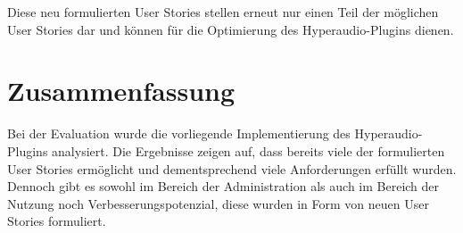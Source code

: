 Diese neu formulierten User Stories stellen erneut nur einen Teil der möglichen User Stories dar und können für die Optimierung des Hyperaudio-Plugins dienen.

\section{Zusammenfassung}
Bei der Evaluation wurde die vorliegende Implementierung des Hyperaudio-Plugins analysiert. Die Ergebnisse zeigen auf, dass bereits viele der formulierten User Stories ermöglicht und dementsprechend viele Anforderungen erfüllt wurden. Dennoch gibt es sowohl im Bereich der Administration als auch im Bereich der Nutzung noch Verbesserungspotenzial, diese wurden in Form von neuen User Stories formuliert.